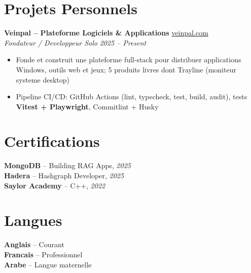 \documentclass[10pt,a4paper]{article}
\begin{document}
\vspace{4pt}
\section*{Projets Personnels}
{\small
\textbf{Veinpal -- Plateforme Logiciels \& Applications} \hfill \href{https://veinpal.com}{veinpal.com}\\[1pt]
\textit{Fondateur / Developpeur Solo} \hfill \textit{2025 -- Present}
\begin{itemize}
  \item Fonde et construit une plateforme full-stack pour distribuer applications Windows, outils web et jeux; 5 produits livres dont Trayline (moniteur systeme desktop)
  \item Pipeline CI/CD: GitHub Actions (lint, typecheck, test, build, audit), tests \textbf{Vitest + Playwright}, Commitlint + Husky
\end{itemize}
}

\vspace{4pt}
\section*{Certifications}
{\small
\textbf{MongoDB} -- Building RAG Apps, \textit{2025}\\[1pt]
\textbf{Hadera} -- Hashgraph Developer, \textit{2025}\\[1pt]
\textbf{Saylor Academy} -- C++, \textit{2022}
}

\section*{Langues}
{\small
\textbf{Anglais} -- Courant\\[1pt]
\textbf{Francais} -- Professionnel\\[1pt]
\textbf{Arabe} -- Langue maternelle
}
\end{document}
